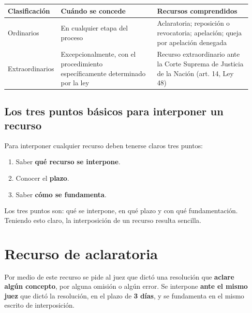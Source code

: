 \documentclass[12pt,oneside]{book}
\begin{document}
\begin{table}[H]
\centering
\renewcommand{\arraystretch}{1.3}
\begin{tabularx}{\textwidth}{
    >{\raggedright\arraybackslash}p{}
    >{\raggedright\arraybackslash}X
    >{\raggedright\arraybackslash}X
}
\toprule
\textbf{Clasificaci\'on} & \textbf{Cu\'ando se concede} & \textbf{Recursos comprendidos} \\
\midrule
Ordinarios & En cualquier etapa del proceso & Aclaratoria; reposici\'on o revocatoria; apelaci\'on; queja por apelaci\'on denegada \\
Extraordinarios & Excepcionalmente, con el procedimiento espec\'ificamente determinado por la ley & Recurso extraordinario ante la Corte Suprema de Justicia de la Naci\'on (art. 14, Ley 48) \\
\bottomrule
\end{tabularx}
\end{table}

\subsection{Los tres puntos b\'asicos para interponer un recurso}

Para interponer cualquier recurso deben tenerse claros tres puntos:

\begin{enumerate}
    \item Saber \textbf{qu\'e recurso se interpone}.
    \item Conocer el \textbf{plazo}.
    \item Saber \textbf{c\'omo se fundamenta}.
\end{enumerate}

\begin{important}
Los tres puntos son: qu\'e se interpone, en qu\'e plazo y con qu\'e fundamentaci\'on. Teniendo esto claro, la interposici\'on de un recurso resulta sencilla.
\end{important}

\section{Recurso de aclaratoria}

Por medio de este recurso se pide al juez que dict\'o una resoluci\'on que \textbf{aclare alg\'un concepto}, por alguna omisi\'on o alg\'un error. Se interpone \textbf{ante el mismo juez} que dict\'o la resoluci\'on, en el plazo de \textbf{3 d\'ias}, y se fundamenta en el mismo escrito de interposici\'on.
\end{document}
